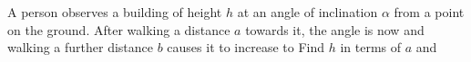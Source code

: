 A person observes a building of height $h$ at an angle of inclination $\alpha$ from a point on the ground. After walking a distance $a$ towards it, the angle is now  and walking a further distance $b$ causes it to increase to  Find $h$ in terms of $a$ and 